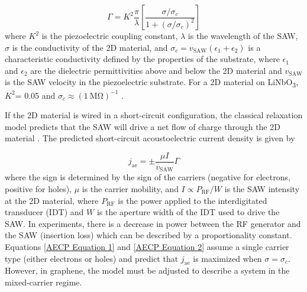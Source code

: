 \documentclass[double,12pt,1in,seploa]{beavtex}
\begin{document}
\begin{equation}
    \Gamma = K^2\frac{\pi}{\lambda}\left[\frac{\sigma/\sigma_c}{1+ (\sigma/\sigma_c)^2}\right]
    \label{AECP Equation 1}
\end{equation}
where $K^2$ is the piezoelectric coupling constant, $\lambda$ is the wavelength of the SAW, $\sigma$ is the conductivity of the 2D material, and $\sigma_c = v_{\mathrm{SAW}}(\epsilon_1 + \epsilon_2)$  is a characteristic conductivity defined by the properties of the substrate, where $\epsilon_1$ and $\epsilon_2$ are the dielectric permittivities above and below the 2D material and $v_{\mathrm{SAW}}$ is the SAW velocity in the piezoelectric substrate. For a 2D material on LiNbO\textsubscript{3},$K^2$= 0.05 and $\sigma_c \approx (\SI{1}{\mega\ohm})^{-1}$  \cite{wixforth_surface_1989,rotter_giant_1998}.

If the 2D material is wired in a short-circuit configuration, the classical relaxation model predicts that the SAW will drive a net flow of charge through the 2D material \cite{rotter_giant_1998}. The predicted short-circuit acoustoelectric current density is given by

\begin{equation}
    j_{\mathrm{ae}} = \pm \frac{\mu I}{v_{\mathrm{SAW}}}\Gamma
    \label{AECP Equation 2}
\end{equation}
where the sign is determined by the sign of the carriers (negative for electrons, positive for holes), $\mu$ is the carrier mobility, and $I \propto P_{\mathrm{RF}}/W$ is the SAW intensity at the 2D material, where $P_{\mathrm{RF}}$ is the power applied to the interdigitated transducer (IDT) and $W$ is the aperture width of the IDT used to drive the SAW. In experiments, there is a decrease in power between the RF generator and the SAW (insertion loss) which can be described by a proportionality constant. Equations \ref{AECP Equation 1} and \ref{AECP Equation 2} assume a single carrier type (either electrons or holes) and predict that $j_{\mathrm{ae}}$ is maximized when $\sigma = \sigma_c$. However, in graphene, the model must be adjusted to describe a system in the mixed-carrier regime.
\end{document}
